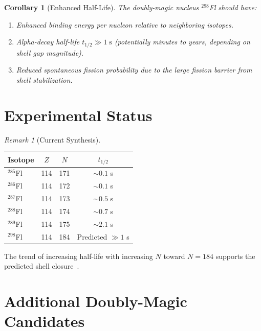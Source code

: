 \documentclass[12pt,a4paper]{article}
\newtheorem{corollary}[theorem]{Corollary}
\theoremstyle{definition}
\theoremstyle{remark}
\newtheorem{remark}[theorem]{Remark}
\begin{document}
\begin{corollary}[Enhanced Half-Life]
The doubly-magic nucleus ${}^{298}$Fl should have:
\begin{enumerate}[label=(\roman*)]
  \item Enhanced binding energy per nucleon relative to
  neighboring isotopes.
  \item Alpha-decay half-life $t_{1/2} \gg 1\;\mathrm{s}$
  (potentially minutes to years, depending on shell gap
  magnitude).
  \item Reduced spontaneous fission probability due to the
  large fission barrier from shell stabilization.
\end{enumerate}
\end{corollary}

\section{Experimental Status}
\label{sec:experiment}

\begin{remark}[Current Synthesis]
\begin{center}
\renewcommand{\arraystretch}{1.3}
\begin{tabular}{@{}lccc@{}}
\toprule
\textbf{Isotope} & $Z$ & $N$ & $t_{1/2}$ \\
\midrule
${}^{285}$Fl & 114 & 171 & $\sim 0.1$ s \\
${}^{286}$Fl & 114 & 172 & $\sim 0.1$ s \\
${}^{287}$Fl & 114 & 173 & $\sim 0.5$ s \\
${}^{288}$Fl & 114 & 174 & $\sim 0.7$ s \\
${}^{289}$Fl & 114 & 175 & $\sim 2.1$ s \\
${}^{298}$Fl & 114 & 184 & Predicted $\gg 1$ s \\
\bottomrule
\end{tabular}
\end{center}
The trend of increasing half-life with increasing $N$ toward
$N = 184$ supports the predicted shell closure~\cite{Oganessian2006}.
\end{remark}

\section{Additional Doubly-Magic Candidates}
\label{sec:additional}
\end{document}

